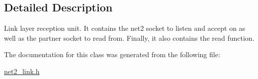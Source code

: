 \subsection{Detailed Description}
Link layer reception unit. It contains the net2 socket to listen and accept on as well as the partner socket to read from. Finally, it also contains the read function. 

The documentation for this class was generated from the following file\-:\begin{DoxyCompactItemize}
\item 
\hyperlink{net2__link_8h}{net2\-\_\-link.\-h}\end{DoxyCompactItemize}
